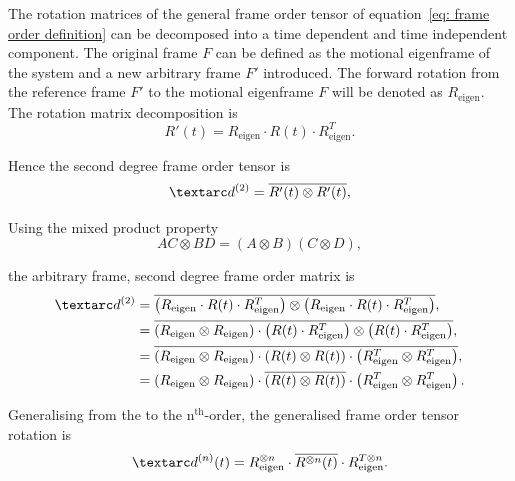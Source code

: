 The rotation matrices of the general frame order tensor of equation~\ref{eq: frame order definition} can be decomposed into a time dependent and time independent component.
The original frame $F$ can be defined as the motional eigenframe of the system and a new arbitrary frame $F'$ introduced.
The forward rotation from the reference frame $F'$ to the motional eigenframe $F$ will be denoted as $R_\textrm{eigen}$.
The rotation matrix decomposition is
\begin{equation}
    R'(t) = R_\textrm{eigen} \cdot R(t) \cdot R_\textrm{eigen}^T .
\end{equation}

Hence the second degree frame order tensor is
\begin{equation}
    \FOtwo = \overline{R'(t) \otimes R'(t)} ,
\end{equation}

Using the mixed product property
\begin{equation}
    AC \otimes BD = (A \otimes B)(C \otimes D) ,
\end{equation}

the arbitrary frame, second degree frame order matrix is
\begin{subequations}
\begin{align}
    \FOtwo &= \overline{\left( R_\textrm{eigen} \cdot R(t) \cdot R_\textrm{eigen}^T \right) \otimes \left( R_\textrm{eigen} \cdot R(t) \cdot R_\textrm{eigen}^T \right)} , \\
            &= \overline{\left(R_\textrm{eigen} \otimes R_\textrm{eigen} \right) \cdot \left( R(t) \cdot R_\textrm{eigen}^T \right) \otimes \left( R(t) \cdot R_\textrm{eigen}^T \right)} , \\
            &= \overline{\left(R_\textrm{eigen} \otimes R_\textrm{eigen} \right) \cdot \left( R(t) \otimes R(t) \right) \cdot \left( R_\textrm{eigen}^T \otimes R_\textrm{eigen}^T \right)} , \\
            &= \left(R_\textrm{eigen} \otimes R_\textrm{eigen} \right) \cdot \overline{\left( R(t) \otimes R(t) \right)} \cdot \left( R_\textrm{eigen}^T \otimes R_\textrm{eigen}^T \right) .
\end{align}
\end{subequations}

Generalising from the  to the n$^\textrm{th}$-order, the generalised frame order tensor rotation is
\begin{equation} \label{eq: frame order equation, arbitrary frame}
    \FOn(t) = R_\textrm{eigen}^{\otimes n} \cdot \overline{R^{\otimes n}(t)} \cdot R_\textrm{eigen}^{T \otimes n} .
\end{equation}




